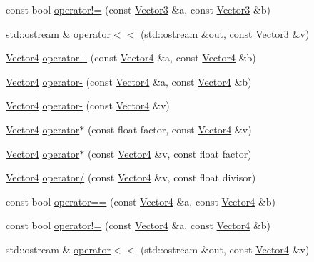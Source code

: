 \begin{DoxyCompactItemize}
\item 
const bool \hyperlink{namespaceprism_aa752c5d0210902dece31c2fcfc98a824}{operator!=} (const \hyperlink{classprism_1_1_vector3}{Vector3} \&a, const \hyperlink{classprism_1_1_vector3}{Vector3} \&b)
\item 
std\+::ostream \& \hyperlink{namespaceprism_aa7b9367a483153af865552ba486f1196}{operator$<$$<$} (std\+::ostream \&out, const \hyperlink{classprism_1_1_vector3}{Vector3} \&v)
\item 
\hyperlink{classprism_1_1_vector4}{Vector4} \hyperlink{namespaceprism_a4ac9ebc0ce1449793eb8f521c64929a9}{operator+} (const \hyperlink{classprism_1_1_vector4}{Vector4} \&a, const \hyperlink{classprism_1_1_vector4}{Vector4} \&b)
\item 
\hyperlink{classprism_1_1_vector4}{Vector4} \hyperlink{namespaceprism_a038a64f530d1c50bf72cf1a23886ecca}{operator-\/} (const \hyperlink{classprism_1_1_vector4}{Vector4} \&a, const \hyperlink{classprism_1_1_vector4}{Vector4} \&b)
\item 
\hyperlink{classprism_1_1_vector4}{Vector4} \hyperlink{namespaceprism_a147712ae50c37618cbc61f20efe6729f}{operator-\/} (const \hyperlink{classprism_1_1_vector4}{Vector4} \&v)
\item 
\hyperlink{classprism_1_1_vector4}{Vector4} \hyperlink{namespaceprism_aa652a61fe96302693aa0279e832360c7}{operator$\ast$} (const float factor, const \hyperlink{classprism_1_1_vector4}{Vector4} \&v)
\item 
\hyperlink{classprism_1_1_vector4}{Vector4} \hyperlink{namespaceprism_ab3b4a59d9247143b49db3c2778838895}{operator$\ast$} (const \hyperlink{classprism_1_1_vector4}{Vector4} \&v, const float factor)
\item 
\hyperlink{classprism_1_1_vector4}{Vector4} \hyperlink{namespaceprism_a4aa2b9a75c3d5134fc80cc6afc1be443}{operator/} (const \hyperlink{classprism_1_1_vector4}{Vector4} \&v, const float divisor)
\item 
const bool \hyperlink{namespaceprism_a80bdef743a64c754bf1a2b217c82f60a}{operator==} (const \hyperlink{classprism_1_1_vector4}{Vector4} \&a, const \hyperlink{classprism_1_1_vector4}{Vector4} \&b)
\item 
const bool \hyperlink{namespaceprism_a1ffa413af039c2bff07202dcfce55f05}{operator!=} (const \hyperlink{classprism_1_1_vector4}{Vector4} \&a, const \hyperlink{classprism_1_1_vector4}{Vector4} \&b)
\item 
std\+::ostream \& \hyperlink{namespaceprism_aeb86919d9ba71747d21fbd6e28671692}{operator$<$$<$} (std\+::ostream \&out, const \hyperlink{classprism_1_1_vector4}{Vector4} \&v)
\end{DoxyCompactItemize}


